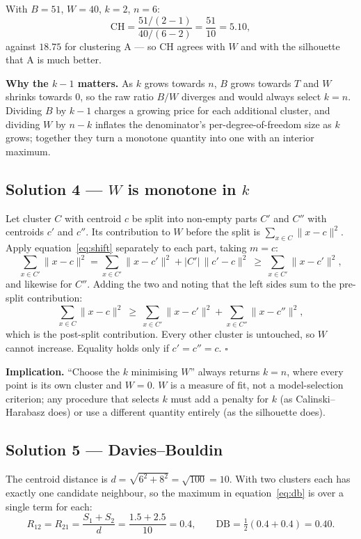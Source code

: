 \documentclass[11pt]{article}
\begin{document}
With $B = 51$, $W = 40$, $k = 2$, $n = 6$:
\[
  \mathrm{CH} = \frac{51/(2-1)}{40/(6-2)} = \frac{51}{10} = \mathbf{5.10},
\]
against $18.75$ for clustering A --- so CH agrees with $W$ and with the
silhouette that A is much better.

\textbf{Why the $k-1$ matters.} As $k$ grows towards $n$, $B$ grows towards
$T$ and $W$ shrinks towards $0$, so the raw ratio $B/W$ diverges and would
always select $k = n$. Dividing $B$ by $k-1$ charges a growing price for each
additional cluster, and dividing $W$ by $n-k$ inflates the denominator's
per-degree-of-freedom size as $k$ grows; together they turn a monotone
quantity into one with an interior maximum.

\subsection*{Solution 4 --- $W$ is monotone in $k$}

Let cluster $C$ with centroid $c$ be split into non-empty parts $C'$ and
$C''$ with centroids $c'$ and $c''$. Its contribution to $W$ before the split
is $\sum_{x \in C}\lVert x - c\rVert^2$. Apply equation~\eqref{eq:shift}
separately to each part, taking $m = c$:
\[
  \sum_{x \in C'}\lVert x - c\rVert^2
    = \sum_{x \in C'}\lVert x - c'\rVert^2 + |C'|\,\lVert c' - c\rVert^2
  \ \geq\ \sum_{x \in C'}\lVert x - c'\rVert^2 ,
\]
and likewise for $C''$. Adding the two and noting that the left sides sum to
the pre-split contribution:
\[
  \sum_{x \in C}\lVert x - c\rVert^2
  \ \geq\ \sum_{x \in C'}\lVert x - c'\rVert^2
        + \sum_{x \in C''}\lVert x - c''\rVert^2 ,
\]
which is the post-split contribution. Every other cluster is untouched, so
$W$ cannot increase. Equality holds only if $c' = c'' = c$. \ensuremath{\square}

\textbf{Implication.} ``Choose the $k$ minimising $W$'' always returns
$k = n$, where every point is its own cluster and $W = 0$. $W$ is a measure of
fit, not a model-selection criterion; any procedure that selects $k$ must add
a penalty for $k$ (as Calinski--Harabasz does) or use a different quantity
entirely (as the silhouette does).

\subsection*{Solution 5 --- Davies--Bouldin}

The centroid distance is $d = \sqrt{6^2 + 8^2} = \sqrt{100} = 10$. With two
clusters each has exactly one candidate neighbour, so the maximum in
equation~\eqref{eq:db} is over a single term for each:
\[
  R_{12} = R_{21} = \frac{S_1 + S_2}{d} = \frac{1.5 + 2.5}{10} = 0.4,
  \qquad
  \mathrm{DB} = \tfrac{1}{2}(0.4 + 0.4) = \mathbf{0.40}.
\]
\end{document}
